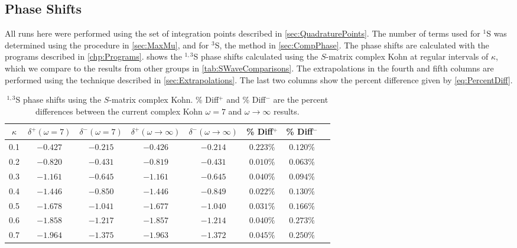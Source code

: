 \documentclass[Dissertation.tex]{subfiles}
\begin{document}
\subsection{Phase Shifts}
All runs here were performed using the set of integration points described in 
\cref{sec:QuadraturePoints}. The number of terms used for $^1$S was determined
using the procedure in \cref{sec:MaxMu}, and for $^3$S, the method in
\cref{sec:CompPhase}. The phase shifts are calculated with the programs 
described in \cref{chp:Programs}.  shows the $^{1,3}$S phase shifts 
calculated using the $S$-matrix complex Kohn at regular intervals of $\kappa$, which we 
compare to the results from other groups in \cref{tab:SWaveComparisons}. 
The extrapolations in the fourth and fifth columns are performed using the 
technique described in \cref{sec:Extrapolations}. The last two columns show 
the percent difference given by \cref{eq:PercentDiff}.

\begin{table}
\centering
\begin{tabular}{c c c c c c c c}
\toprule
$\kappa$ & $\delta^+ (\omega = 7)$ & $\delta^- (\omega = 7)$ & $\delta^+ (\omega \rightarrow \infty)$ & $\delta^- (\omega \rightarrow \infty)$ & \% Diff$^+$ & \% Diff$^-$ \\
\midrule
0.1 & $-0.427$ & $-0.215$ & $-0.426$ & $-0.214$ & $0.223\%$ & $0.120\%$ \\
0.2 & $-0.820$ & $-0.431$ & $-0.819$ & $-0.431$ & $0.010\%$ & $0.063\%$ \\
0.3 & $-1.161$ & $-0.645$ & $-1.161$ & $-0.645$ & $0.040\%$ & $0.094\%$ \\
0.4 & $-1.446$ & $-0.850$ & $-1.446$ & $-0.849$ & $0.022\%$ & $0.130\%$ \\
0.5 & $-1.678$ & $-1.041$ & $-1.677$ & $-1.040$ & $0.031\%$ & $0.166\%$ \\
0.6 & $-1.858$ & $-1.217$ & $-1.857$ & $-1.214$ & $0.040\%$ & $0.273\%$ \\
0.7 & $-1.964$ & $-1.375$ & $-1.963$ & $-1.372$ & $0.045\%$ & $0.250\%$ \\
\bottomrule
\end{tabular}
\caption[$^{1,3}$S complex Kohn phase shifts]{$^{1,3}$S phase shifts using the $S$-matrix complex Kohn. \% Diff$^+$ and \% Diff$^-$ are the percent differences between the
 current complex Kohn $\omega = 7$ and $\omega \rightarrow \infty$ results.}
\label{tab:SWavePhase}
\end{table}
\end{document}

